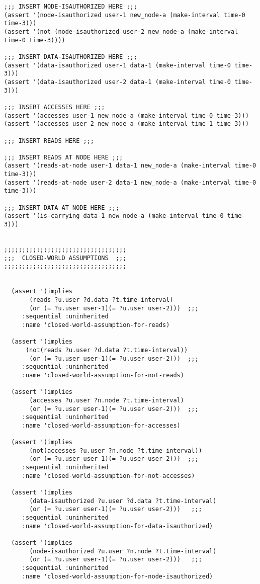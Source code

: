 \begin{lstlisting}
;;; INSERT NODE-ISAUTHORIZED HERE ;;;
(assert '(node-isauthorized user-1 new_node-a (make-interval time-0 time-3)))
(assert '(not (node-isauthorized user-2 new_node-a (make-interval time-0 time-3))))

;;; INSERT DATA-ISAUTHORIZED HERE ;;;
(assert '(data-isauthorized user-1 data-1 (make-interval time-0 time-3)))
(assert '(data-isauthorized user-2 data-1 (make-interval time-0 time-3)))

;;; INSERT ACCESSES HERE ;;;
(assert '(accesses user-1 new_node-a (make-interval time-0 time-3)))
(assert '(accesses user-2 new_node-a (make-interval time-1 time-3)))

;;; INSERT READS HERE ;;;

;;; INSERT READS AT NODE HERE ;;;
(assert '(reads-at-node user-1 data-1 new_node-a (make-interval time-0 time-3)))
(assert '(reads-at-node user-2 data-1 new_node-a (make-interval time-0 time-3)))

;;; INSERT DATA AT NODE HERE ;;;
(assert '(is-carrying data-1 new_node-a (make-interval time-0 time-3)))


;;;;;;;;;;;;;;;;;;;;;;;;;;;;;;;;;;
;;;  CLOSED-WORLD ASSUMPTIONS  ;;;
;;;;;;;;;;;;;;;;;;;;;;;;;;;;;;;;;;


  (assert '(implies
       (reads ?u.user ?d.data ?t.time-interval)
       (or (= ?u.user user-1)(= ?u.user user-2)))  ;;;
     :sequential :uninherited
     :name 'closed-world-assumption-for-reads)

  (assert '(implies
      (not(reads ?u.user ?d.data ?t.time-interval))
       (or (= ?u.user user-1)(= ?u.user user-2)))  ;;;
     :sequential :uninherited
     :name 'closed-world-assumption-for-not-reads)

  (assert '(implies
       (accesses ?u.user ?n.node ?t.time-interval)
       (or (= ?u.user user-1)(= ?u.user user-2)))  ;;;
     :sequential :uninherited
     :name 'closed-world-assumption-for-accesses)

  (assert '(implies
       (not(accesses ?u.user ?n.node ?t.time-interval))
       (or (= ?u.user user-1)(= ?u.user user-2)))  ;;;
     :sequential :uninherited
     :name 'closed-world-assumption-for-not-accesses)

  (assert '(implies
       (data-isauthorized ?u.user ?d.data ?t.time-interval)
       (or (= ?u.user user-1)(= ?u.user user-2)))   ;;;
     :sequential :uninherited
     :name 'closed-world-assumption-for-data-isauthorized)

  (assert '(implies
       (node-isauthorized ?u.user ?n.node ?t.time-interval)
       (or (= ?u.user user-1)(= ?u.user user-2)))   ;;;
     :sequential :uninherited
     :name 'closed-world-assumption-for-node-isauthorized)


\end{lstlisting}
